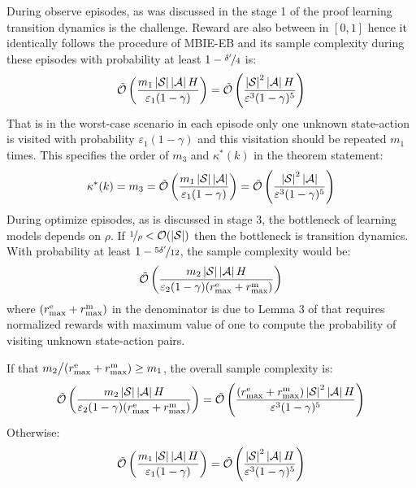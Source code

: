 During observe episodes, as was discussed in the stage 1 of the proof learning transition dynamics is the challenge. Reward are also between in $[0, 1]$ hence it identically follows the procedure of MBIE-EB and its sample complexity during these episodes with probability at least $1 - \nicefrac{\delta'}{4}$ is:
%
\begin{equation*}
    \Tilde{\mathcal{O}}\left(\frac{m_1\left \lvert \mathcal{S} \right \rvert\left \lvert \mathcal{A} \right \rvert H}{\varepsilon_1(1 - \gamma)}\right) = \Tilde{\mathcal{O}}\left(\frac{\left \lvert \mathcal{S} \right \rvert^2\left \lvert \mathcal{A} \right \rvert H}{\varepsilon^3(1 - \gamma)^5}\right)
\end{equation*}
%
That is in the worst-case scenario in each episode only one unknown state-action is visited with probability $\varepsilon_1(1 - \gamma)$ and this visitation should be repeated $m_1$ times. This specifies the order of $m_3$ and $\kappa^*(k)$ in the theorem statement:
%
%
\begin{equation*}
    \kappa^*(k) = m_3 = \Tilde{\mathcal{O}}\left(\frac{m_1\left \lvert \mathcal{S} \right \rvert\left \lvert \mathcal{A} \right \rvert}{\varepsilon_1(1 - \gamma)}\right) = \Tilde{\mathcal{O}}\left(\frac{\left \lvert \mathcal{S} \right \rvert^2\left \lvert \mathcal{A} \right \rvert}{\varepsilon^3(1 - \gamma)^5}\right)
\end{equation*}
%
%
During optimize episodes, as is discussed in stage 3, the bottleneck of learning models depends on $\rho$. If $\nicefrac{1}{\rho} < \mathcal{O}(\left \lvert \mathcal{S} \right \rvert)$ then the bottleneck is transition dynamics. With probability at least $1 - \nicefrac{5\delta'}{12}$, the sample complexity would be:
%
\begin{equation*}
    \Tilde{\mathcal{O}}\left(\frac{m_2\left \lvert \mathcal{S} \right \rvert\left \lvert \mathcal{A} \right \rvert H}{\varepsilon_2(1 - \gamma)(r_{\text{max}}^\text{e} + r_{\text{max}}^\text{m})}\right)
\end{equation*}
%
where $(r_{\text{max}}^\text{e} + r_{\text{max}}^\text{m})$ in the denominator is due to Lemma 3 of \citet{strehl2008analysis} that requires normalized rewards with maximum value of one to compute the probability of visiting unknown state-action pairs. 

If that $m_2 \big/ (r_{\text{max}}^\text{e} + r_{\text{max}}^\text{m}) \geq m_1$, the overall sample complexity is:
%
\begin{equation*}
    \Tilde{\mathcal{O}}\left(\frac{m_2\left \lvert \mathcal{S} \right \rvert\left \lvert \mathcal{A} \right \rvert H}{\varepsilon_2(1 - \gamma)(r_{\text{max}}^\text{e} + r_{\text{max}}^\text{m})}\right) =     \Tilde{\mathcal{O}}\left(\frac{(r_{\text{max}}^\text{e} + r_{\text{max}}^\text{m})\left \lvert \mathcal{S} \right \rvert^2\left \lvert \mathcal{A} \right \rvert H}{\varepsilon^3(1 - \gamma)^5}\right)
\end{equation*}
%
Otherwise:
\begin{equation*}
    \Tilde{\mathcal{O}}\left(\frac{m_1\left \lvert \mathcal{S} \right \rvert\left \lvert \mathcal{A} \right \rvert H}{\varepsilon_1(1 - \gamma)}\right) =     \Tilde{\mathcal{O}}\left(\frac{\left \lvert \mathcal{S} \right \rvert^2\left \lvert \mathcal{A} \right \rvert H}{\varepsilon^3(1 - \gamma)^5}\right)
\end{equation*}
%

